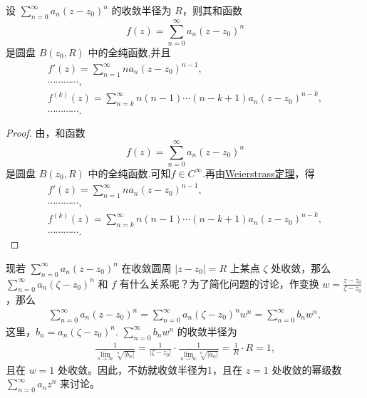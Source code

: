 \documentclass[../../main.tex]{subfiles}
\begin{document}
\begin{theorem}\label{theorem:幂级数在其收敛圆内确定一个全纯函数并且任意阶可导}
设 \( \sum_{n=0}^{\infty} a_n(z - z_0)^n \) 的收敛半径为 \( R \)，则其和函数
\[
f(z) = \sum_{n=0}^{\infty} a_n(z - z_0)^n
\]
是圆盘 \( B(z_0, R) \) 中的全纯函数,并且
\begin{gather*}
f'(z) = \sum_{n=1}^{\infty} n a_n(z - z_0)^{n - 1},
\\
\cdots\cdots\cdots\cdots,
\\
f^{(k)}(z) = \sum_{n=k}^{\infty} n(n - 1)\cdots(n - k + 1) a_n(z - z_0)^{n - k},
\\
\cdots\cdots\cdots\cdots.
\end{gather*}
\end{theorem}
\begin{proof}
由，和函数
\[
f(z) = \sum_{n=0}^{\infty} a_n(z - z_0)^n
\]
是圆盘 \( B(z_0, R) \) 中的全纯函数.可知$f\in C^{\infty}$.再由\hyperref[theorem:Weierstrass定理]{Weierstrass定理}，得
\begin{gather*}
f'(z) = \sum_{n=1}^{\infty} n a_n(z - z_0)^{n - 1},
\\
\cdots\cdots\cdots\cdots,
\\
f^{(k)}(z) = \sum_{n=k}^{\infty} n(n - 1)\cdots(n - k + 1) a_n(z - z_0)^{n - k},
\\
\cdots\cdots\cdots\cdots.
\end{gather*}
\end{proof}



现若 \( \sum_{n=0}^{\infty} a_n(z - z_0)^n \) 在收敛圆周 \( |z - z_0| = R \) 上某点 \( \zeta \) 处收敛，那么 \( \sum_{n=0}^{\infty} a_n(\zeta - z_0)^n \) 和 \( f \) 有什么关系呢？为了简化问题的讨论，作变换 \( w = \frac{z - z_0}{\zeta - z_0} \)，那么
\begin{align*}
\sum_{n=0}^{\infty} a_n(z - z_0)^n = \sum_{n=0}^{\infty} a_n(\zeta - z_0)^n w^n = \sum_{n=0}^{\infty} b_n w^n,
\end{align*}
这里，\( b_n = a_n(\zeta - z_0)^n \).$\,\,$\( \sum_{n=0}^{\infty} b_n w^n \) 的收敛半径为
\begin{align*}
\frac{1}{\underset{n\rightarrow \infty}{\overline{\lim }}\sqrt[n]{|b_n|}}=\frac{1}{|\zeta -z_0|}\cdot \frac{1}{\underset{n\rightarrow \infty}{\overline{\lim }}\sqrt[n]{|a_n|}}=\frac{1}{R}\cdot R=1,
\end{align*}
且在 \( w = 1 \) 处收敛。因此，不妨就收敛半径为1，且在 \( z = 1 \) 处收敛的幂级数 \( \sum_{n=0}^{\infty} a_n z^n \) 来讨论。
\end{document}
